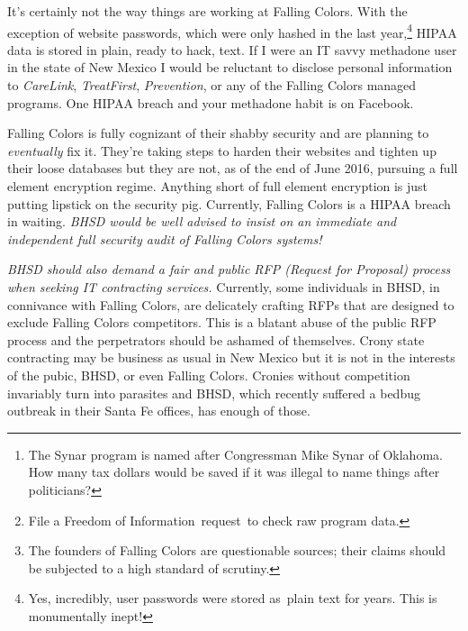 It's certainly not the way things are working at Falling Colors. With
the exception of website passwords, which were only hashed in the last
year,\protect\hyperlink{fn4}{\textsuperscript{4}} HIPAA data is stored
in plain, ready to hack, text. If I were an IT savvy methadone user in
the state of New Mexico I would be reluctant to disclose personal
information to \emph{CareLink}, \emph{TreatFirst}, \emph{Prevention}, or
any of the Falling Colors managed programs. One HIPAA breach and your
methadone habit is on Facebook.

Falling Colors is fully cognizant of their shabby security and are
planning to \emph{eventually} fix it. They're taking steps to harden
their websites and tighten up their loose databases but they are not, as
of the end of June 2016, pursuing a full element encryption regime.
Anything short of full element encryption is just putting lipstick on
the security pig. Currently, Falling Colors is a HIPAA breach in
waiting. \emph{BHSD would be well advised to insist on an immediate and
independent full security audit of Falling Colors systems!}

\emph{BHSD should also demand a fair and public RFP (Request for
Proposal) process when seeking IT contracting services.} Currently, some
individuals in BHSD, in connivance with Falling Colors, are delicately
crafting RFPs that are designed to exclude Falling Colors competitors.
This is a blatant abuse of the public RFP process and the perpetrators
should be ashamed of themselves. Crony state contracting may be business
as usual in New Mexico but it is not in the interests of the pubic,
BHSD, or even Falling Colors. Cronies without competition invariably
turn into parasites and BHSD, which recently suffered a bedbug outbreak
in their Santa Fe offices, has enough of those.

\begin{center}\rule{0.5\linewidth}{\linethickness}\end{center}

\begin{enumerate}
\item
  \hypertarget{fn1}{}

  The Synar program is named after Congressman Mike Synar of Oklahoma.
  How many tax dollars would be saved if it was illegal to name things
  after politicians?\protect\hyperlink{fnref1}{↩}
\item
  \hypertarget{fn2}{}

  File a Freedom of Information~request~to check raw program
  data.\protect\hyperlink{fnref2}{↩}
\item
  \hypertarget{fn3}{}

  The founders of Falling Colors are questionable sources; their claims
  should be subjected to a high standard of
  scrutiny.\protect\hyperlink{fnref3}{↩}
\item
  \hypertarget{fn4}{}

  Yes, incredibly, user passwords were stored as~plain text for years.
  This is monumentally inept!\protect\hyperlink{fnref4}{↩}
\end{enumerate}



